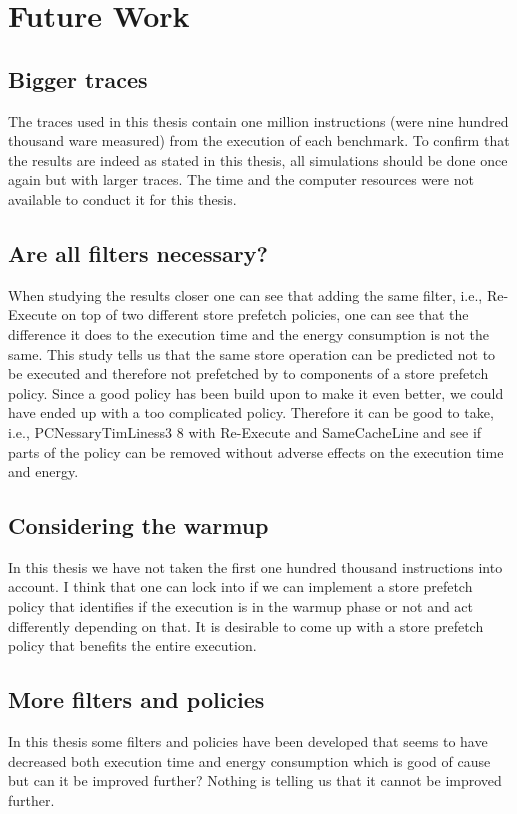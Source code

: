 \chapter{Future Work}
\label{chap:fetueredWork}

\section{Bigger traces} The traces used in this thesis contain one million instructions (were nine hundred thousand ware measured) from the execution of each benchmark. To confirm that the results are indeed as stated in this thesis, all simulations should be done once again but with larger traces. The time and the computer resources were not available to conduct it for this thesis.

\section{Are all filters necessary?} When studying the results closer one can see that adding the same filter, i.e., Re-Execute on top of two different store prefetch policies, one can see that the difference it does to the execution time and the energy consumption is not the same. This study tells us that the same store operation can be predicted not to be executed and therefore not prefetched by to components of a store prefetch policy. Since a good policy has been build upon to make it even better, we could have ended up with a too complicated policy. Therefore it can be good to take, i.e., PCNessaryTimLiness3 8 with Re-Execute and SameCacheLine and see if parts of the policy can be removed without adverse effects on the execution time and energy. 

\section{Considering the warmup} In this thesis we have not taken the first one hundred thousand instructions into account. I think that one can lock into if we can implement a store prefetch policy that identifies if the execution is in the warmup phase or not and act differently depending on that. It is desirable to come up with a store prefetch policy that benefits the entire execution.

\section{More filters and policies} In this thesis some filters and policies have been developed that seems to have decreased both execution time and energy consumption which is good of cause but can it be improved further? Nothing is telling us that it cannot be improved further.


